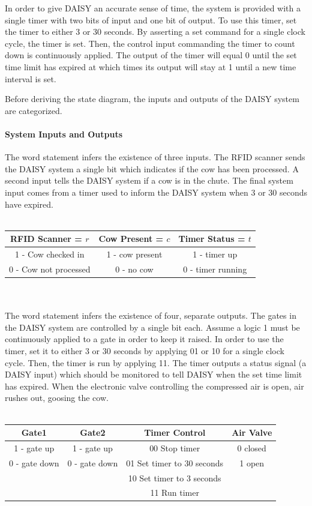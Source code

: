 In order to give DAISY an accurate sense of time, the system is
provided with a single timer with two bits of input and one bit of
output.  To use this timer, set the timer to either 3 or
30 seconds.  By asserting a set command for a single
clock cycle, the timer is set.  Then, the control input commanding the timer to count
down is continuously applied.  The output of the timer will equal
0 until the set time limit has expired at which times its output
will stay at 1 until a new time interval is set. 

Before deriving the state diagram, the inputs and outputs of
the DAISY system are categorized.

\paragraph{System Inputs and Outputs}
The word statement infers the existence of three inputs.  The RFID 
scanner sends the DAISY system a single bit which indicates if the cow has been
processed.  A second input tells the DAISY system if a cow is in
the chute. The final system input comes from a timer used
to inform the DAISY system when 3 or 30 seconds have expired.
\\ \\
\begin{tabular}{c|c|c}
RFID Scanner = $r$	& Cow Present = $c$	& Timer Status = $t$	\\ \hline \hline
1 - Cow checked in	& 1 - cow present	& 1 - timer up		\\ \hline
0 - Cow not processed	& 0 - no cow		& 0 - timer running	\\ 
\end{tabular}
\\ \\
The word statement infers the existence of four, separate outputs.  The gates in the
DAISY system are controlled by a single bit each.  Assume
a logic 1 must be continuously applied to a gate in order to keep it raised. In order
to use the timer, set it to either 3 or 30 seconds by applying 01 or
10 for a single clock cycle.  Then, the timer is run by applying 11.  The timer
outputs a status signal (a DAISY input) which should be monitored to tell
DAISY when the set time limit has expired.  When the electronic valve
controlling the compressed air is open, air rushes out, goosing the cow.
\\ \\
\begin{tabular}{c|c|c|c}
Gate1		& Gate2		& Timer Control			& Air Valve	\\ \hline \hline
1 - gate up 	& 1 - gate up	& 00 Stop timer			& 0 closed	\\ \hline
0 - gate down	& 0 - gate down	& 01 Set timer to 30 seconds	& 1 open	\\ \hline
		&		& 10 Set timer to 3 seconds	&		\\ \hline
		&		& 11 Run timer			&		\\
\end{tabular}


